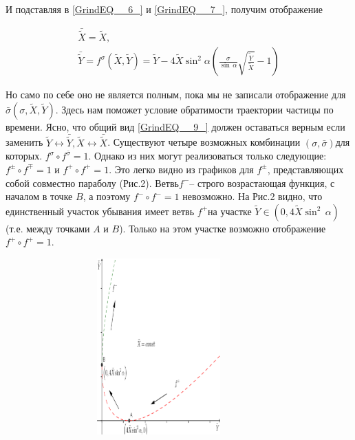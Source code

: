 \documentclass[a4paper]{article}
\begin{document}
И подставляя в \eqref{GrindEQ__6_} и \eqref{GrindEQ__7_}, получим отображение

\begin{equation} \label{GrindEQ__9_} \begin{array}{l} {\bar{\tilde{X}}=\tilde{X},} \\ {\bar{\tilde{Y}}=f^{\sigma } \left(\tilde{X},\tilde{Y}\right)=\tilde{Y}-4\tilde{X}\sin ^{2} \alpha \left(\frac{\sigma }{\sin \, \alpha } \sqrt{\frac{\tilde{Y}}{\tilde{X}} } -1\right)} \end{array} \end{equation}

Но само по себе оно не является полным, пока мы не записали отображение для  $\bar{\sigma }\left(\sigma ,\tilde{X},\tilde{Y}\right)$. Здесь нам поможет условие обратимости траектории частицы по времени. Ясно, что общий вид \eqref{GrindEQ__9_} должен оставаться верным если заменить $\tilde{Y}\leftrightarrow \bar{\tilde{Y}},\tilde{X}\leftrightarrow \bar{\tilde{X}}$. Существуют четыре возможных комбинации $\left(\sigma ,\bar{\sigma }\right)$для которых. $f^{\sigma } \circ f^{\bar{\sigma }} =1$. Однако из них могут реализоваться только следующие: $f^{\pm } \circ f^{\mp } =1$ и $f^{+} \circ f^{+} =1$. Это легко видно из графиков для $f^{\pm } $, представляющих собой совместно параболу (Рис.2). Ветвь$f^{-} $-- строго возрастающая функция, с началом в точке $B$, а поэтому $f^{-} \circ f^{-} =1$ невозможно. На Рис.2 видно, что единственный участок убывания имеет ветвь $f^{+} $на участке $\tilde{Y}\in \left(0,4\tilde{X}\sin ^{2} \, \alpha \right)$(т.е. между точками $A$ и $B$). Только на этом участке возможно отображение $f^{+} \circ f^{+} =1$.

\begin{figure}[ht]
  \centering
  \includegraphics[width=96.8mm, height=67.7mm, viewport=3mm 4mm 205mm 292mm]{image8}\\
  \caption{}\label{image8}
\end{figure}
\end{document}
